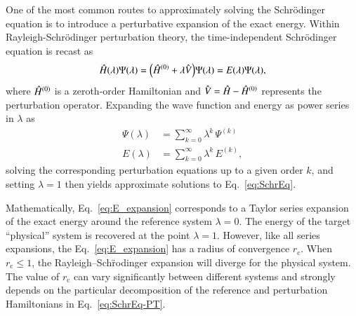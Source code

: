 \documentclass[aps,prb,reprint,noshowkeys,linenumbers,superscriptaddress]{revtex4-1}
\newcommand{\hugh}[1]{\textcolor{hughgreen}{#1}}
\newcommand{\hH}{\Hat{H}}
\newcommand{\hV}{\Hat{V}}
\newcommand{\rc}{r_{\text{c}}}
\begin{document}
\hugh{One of the most common routes to approximately solving the Schr\"odinger equation
is to introduce a perturbative expansion of the exact energy.}
Within Rayleigh-Schr\"odinger perturbation theory, the time-independent Schr\"odinger equation 
is recast as 
\begin{equation} 
	\hH(\lambda) \Psi(\lambda) 
    = \qty(\hH^{(0)} + \lambda \hV ) \Psi(\lambda) 
    = E(\lambda) \Psi(\lambda),
    \label{eq:SchrEq-PT}
\end{equation}
where $\hH^{(0)}$ is a zeroth-order Hamiltonian and $\hV = \hH - \hH^{(0)}$ represents the perturbation operator.
Expanding the wave function and energy as power series in $\lambda$ as 
\begin{subequations}
\begin{align}
    \Psi(\lambda) &= \sum_{k=0}^{\infty} \lambda^{k}\,\Psi^{(k)} 
    \label{eq:psi_expansion}
    \\
    E(\lambda) &= \sum_{k=0}^{\infty} \lambda^{k}\,E^{(k)},
    \label{eq:E_expansion}
\end{align}
\end{subequations}
solving the corresponding perturbation equations up to a given order $k$, and
setting $\lambda = 1$ then yields approximate solutions to Eq.~\eqref{eq:SchrEq}.

Mathematically, Eq.~\eqref{eq:E_expansion} corresponds to a Taylor series expansion of the exact energy
around the reference system $\lambda = 0$.
The energy of the target ``physical'' system is recovered at the point $\lambda = 1$.
However, like all series expansions, the Eq.~\eqref{eq:E_expansion} has a radius of convergence $\rc$. 
When $\rc \le 1$, the Rayleigh--Sch\"{r}odinger expansion will diverge
for the physical system.
The value of $\rc$ can vary significantly between different systems and strongly depends on the particular decomposition
of the reference and perturbation Hamiltonians in Eq.~\eqref{eq:SchrEq-PT}.\cite{Mihalka_2017b}
\end{document}
